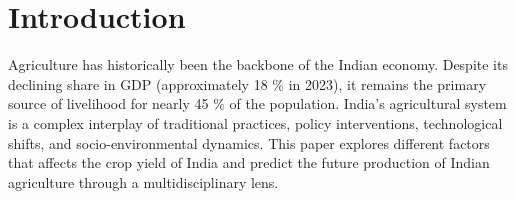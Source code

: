 \section{Introduction}
Agriculture has historically been the backbone of the Indian economy. Despite its declining share in GDP (approximately 18 \% in 2023), it remains the primary source of livelihood for nearly 45 \% of the population. India's agricultural system is a complex interplay of traditional practices, policy interventions, technological shifts, and socio-environmental dynamics. This paper explores different factors that affects the crop yield of India and predict the future production of Indian agriculture through a multidisciplinary lens.
